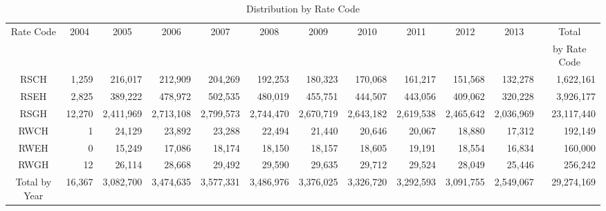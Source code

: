 \begin{table}[!htbp]
\footnotesize
\centering
\caption{Distribution by Rate Code}
\vspace{0.3cm}
\label{Table:Distribution-Observations_By-Rate-Code}
\begin{adjustbox}{scale = 0.85}
\begin{tabular}{c|rrrrrrrrrr|r}
    \toprule \toprule
    Rate Code & \multicolumn{1}{c}{2004} & \multicolumn{1}{c}{2005} & \multicolumn{1}{c}{2006} & \multicolumn{1}{c}{2007} & \multicolumn{1}{c}{2008} & \multicolumn{1}{c}{2009} & \multicolumn{1}{c}{2010} & \multicolumn{1}{c}{2011} & \multicolumn{1}{c}{2012} & \multicolumn{1}{c|}{2013} & \multicolumn{1}{c}{Total} \\
     & & & & & & & & & & & \multicolumn{1}{c}{by Rate Code} \\
    \hline
    RSCH & 1,259 & 216,017 & 212,909 & 204,269 & 192,253 & 180,323 & 170,068 & 161,217 & 151,568 & 132,278 & 1,622,161 \\
   RSEH & 2,825 & 389,222 & 478,972 & 502,535 & 480,019 & 455,751 & 444,507 & 443,056 & 409,062 & 320,228 & 3,926,177 \\
   RSGH & 12,270 & 2,411,969 & 2,713,108 & 2,799,573 & 2,744,470 & 2,670,719 & 2,643,182 & 2,619,538 & 2,465,642 & 2,036,969 & 23,117,440 \\
   RWCH & 1 & 24,129 & 23,892 & 23,288 & 22,494 & 21,440 & 20,646 & 20,067 & 18,880 & 17,312 & 192,149 \\
   RWEH & 0 & 15,249 & 17,086 & 18,174 & 18,150 & 18,157 & 18,605 & 19,191 & 18,554 & 16,834 & 160,000 \\
   RWGH & 12 & 26,114 & 28,668 & 29,492 & 29,590 & 29,635 & 29,712 & 29,524 & 28,049 & 25,446 & 256,242 \\
   \hline
   Total by Year & 16,367 & 3,082,700 & 3,474,635 & 3,577,331 & 3,486,976 & 3,376,025 & 3,326,720 & 3,292,593 & 3,091,755 & 2,549,067 & 29,274,169 \\
    \bottomrule \bottomrule
\end{tabular}
\end{adjustbox}
\end{table}